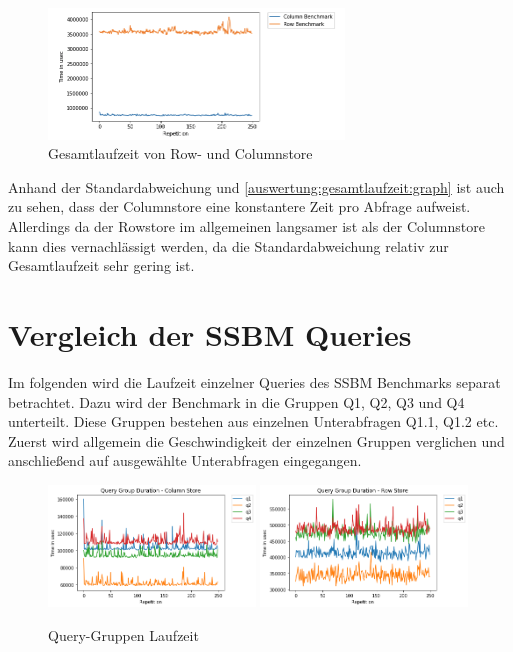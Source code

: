 \begin{figure}[H]
	\centering
	\includegraphics[width=0.7\textwidth]{images/performanceentwicklung.png}
	\caption{Gesamtlaufzeit von Row- und Columnstore}\label{auswertung:gesamtlaufzeit:graph}
\end{figure}
Anhand der Standardabweichung und \autoref{auswertung:gesamtlaufzeit:graph} ist auch zu sehen, dass der Columnstore
eine konstantere Zeit pro Abfrage aufweist.
Allerdings da der Rowstore im allgemeinen langsamer ist als der Columnstore
kann dies vernachlässigt werden, da die Standardabweichung relativ zur
Gesamtlaufzeit sehr gering ist.

\section{Vergleich der SSBM Queries}\label{auswertung:queries}

Im folgenden wird die Laufzeit einzelner Queries des SSBM Benchmarks separat betrachtet.
Dazu wird der Benchmark in die Gruppen Q1, Q2, Q3 und Q4 unterteilt.
Diese Gruppen bestehen aus einzelnen Unterabfragen Q1.1, Q1.2 etc.
Zuerst wird allgemein die Geschwindigkeit der einzelnen Gruppen verglichen
und anschließend auf ausgewählte Unterabfragen eingegangen.

\begin{figure}[H]
	\centering
	\includegraphics[width=0.49\textwidth]{images/Analysis-SSBM-HANA_18_0.png}
	\includegraphics[width=0.49\textwidth]{images/Analysis-SSBM-HANA_23_0.png}
	\caption{Query-Gruppen Laufzeit}\label{auswertung:query-group}
\end{figure}

